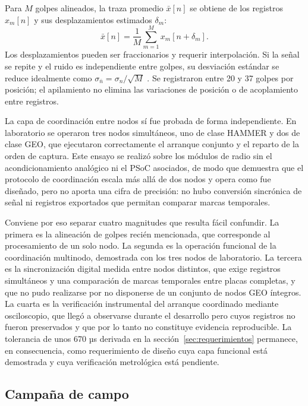 Para $M$ golpes alineados, la traza promedio $\bar x[n]$ se obtiene de los registros $x_m[n]$ y sus desplazamientos estimados $\delta_m$:
\begin{equation}
\bar x[n]=\frac{1}{M}\sum_{m=1}^{M}x_m[n+\delta_m].
\label{eq:apilamiento}
\end{equation}
Los desplazamientos pueden ser fraccionarios y requerir interpolación. Si la señal se repite y el ruido es independiente entre golpes, su desviación estándar se reduce idealmente como $\sigma_{\bar n}=\sigma_n/\sqrt M$ . Se registraron entre 20 y 37 golpes por posición; el apilamiento no elimina las variaciones de posición o de acoplamiento entre registros.

La capa de coordinación entre nodos sí fue probada de forma independiente. En laboratorio se operaron tres nodos simultáneos, uno de clase HAMMER y dos de clase GEO, que ejecutaron correctamente el arranque conjunto y el reparto de la orden de captura. Este ensayo se realizó sobre los módulos de radio sin el acondicionamiento analógico ni el PSoC asociados, de modo que demuestra que el protocolo de coordinación escala más allá de dos nodos y opera como fue diseñado, pero no aporta una cifra de precisión: no hubo conversión sincrónica de señal ni registros exportados que permitan comparar marcas temporales.

Conviene por eso separar cuatro magnitudes que resulta fácil confundir. La primera es la alineación de golpes recién mencionada, que corresponde al procesamiento de un solo nodo. La segunda es la operación funcional de la coordinación multinodo, demostrada con los tres nodos de laboratorio. La tercera es la sincronización digital medida entre nodos distintos, que exige registros simultáneos y una comparación de marcas temporales entre placas completas, y que no pudo realizarse por no disponerse de un conjunto de nodos GEO íntegros. La cuarta es la verificación instrumental del arranque coordinado mediante osciloscopio, que llegó a observarse durante el desarrollo pero cuyos registros no fueron preservados y que por lo tanto no constituye evidencia reproducible. La tolerancia de unos 670 µs derivada en la sección~\ref{sec:requerimientos} permanece, en consecuencia, como requerimiento de diseño cuya capa funcional está demostrada y cuya verificación metrológica está pendiente.

\subsection{Campaña de campo}
\label{sec:campana}


